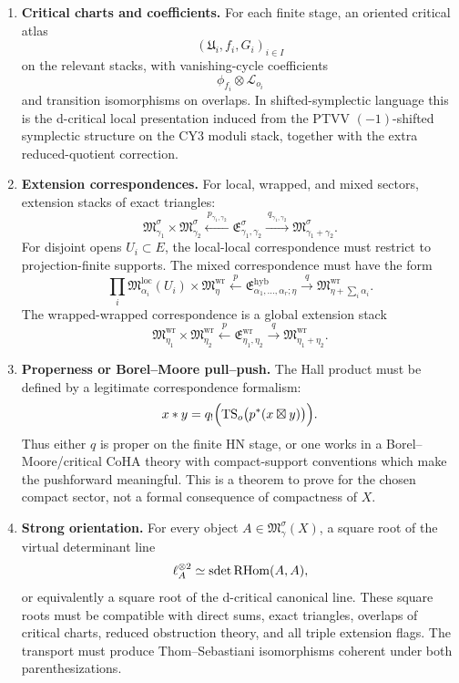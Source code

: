 \begin{enumerate}
\item \textbf{Critical charts and coefficients.}
For each finite stage, an oriented critical atlas
\[
   (\mathfrak U_i,f_i,G_i)_{i\in I}
\]
on the relevant stacks, with vanishing-cycle coefficients
\[
   \phi_{f_i}\otimes\mathscr L_{o_i}
\]
and transition isomorphisms on overlaps.  In shifted-symplectic
language this is the d-critical local presentation induced from the
PTVV \((-1)\)-shifted symplectic structure on the CY3 moduli stack,
together with the extra reduced-quotient correction.

\item \textbf{Extension correspondences.}
For local, wrapped, and mixed sectors, extension stacks of exact
triangles:
\[
\mathfrak M_{\gamma_1}^\sigma\times\mathfrak M_{\gamma_2}^\sigma
\xleftarrow{\ p_{\gamma_1,\gamma_2}\ }
\mathfrak E_{\gamma_1,\gamma_2}^\sigma
\xrightarrow{\ q_{\gamma_1,\gamma_2}\ }
\mathfrak M_{\gamma_1+\gamma_2}^\sigma.
\]
For disjoint opens \(U_i\subset E\), the local-local correspondence
must restrict to projection-finite supports.  The mixed correspondence
must have the form
\[
\prod_i\mathfrak M^{\mathrm{loc}}_{\alpha_i}(U_i)
\times\mathfrak M^{\mathrm{wr}}_\eta
\xleftarrow{\ p\ }
\mathfrak E^{\mathrm{hyb}}_{\alpha_1,\ldots,\alpha_r;\eta}
\xrightarrow{\ q\ }
\mathfrak M^{\mathrm{wr}}_{\eta+\sum_i\alpha_i}.
\]
The wrapped-wrapped correspondence is a global extension stack
\[
\mathfrak M^{\mathrm{wr}}_{\eta_1}\times
\mathfrak M^{\mathrm{wr}}_{\eta_2}
\xleftarrow{\ p\ }
\mathfrak E^{\mathrm{wr}}_{\eta_1,\eta_2}
\xrightarrow{\ q\ }
\mathfrak M^{\mathrm{wr}}_{\eta_1+\eta_2}.
\]

\item \textbf{Properness or Borel--Moore pull--push.}
The Hall product must be defined by a legitimate correspondence
formalism:
\[
   x*y
   =
   q_!\Bigl(\mathrm{TS}_o\bigl(p^*(x\boxtimes y)\bigr)\Bigr).
\]
Thus either \(q\) is proper on the finite HN stage, or one works in a
Borel--Moore/critical CoHA theory with compact-support conventions
which make the pushforward meaningful.  This is a theorem to prove for
the chosen compact sector, not a formal consequence of compactness of
\(X\).

\item \textbf{Strong orientation.}
For every object \(A\in\mathfrak M_\gamma^\sigma(X)\), a square root
of the virtual determinant line
\[
   \ell_A^{\otimes 2}
   \simeq
   \operatorname{sdet} \operatorname{RHom}(A,A),
\]
or equivalently a square root of the d-critical canonical line.  These
square roots must be compatible with direct sums, exact triangles,
overlaps of critical charts, reduced obstruction theory, and all triple
extension flags.  The transport must produce Thom--Sebastiani
isomorphisms coherent under both parenthesizations.


\end{enumerate}
